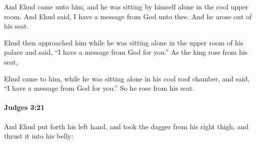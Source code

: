 			\begin{versebox}
					\item[BHS] 
					\item[ASV] And Ehud came unto him; and he was sitting by himself alone in the cool upper room. And Ehud said, I have a message from God unto thee. And he arose out of his seat.
					\item[NIV] Ehud then approached him while he was sitting alone in the upper room of his palace and said, “I have a message from God for you.” As the king rose from his seat,
					\item[NRSV] Ehud came to him, while he was sitting alone in his cool roof chamber, and said, “I have a message from God for you.” So he rose from his seat.
			\end{versebox}

		\paragraph{Judges 3:21} %
			\label{JUDGES-3-21}

			And Ehud put forth his left hand, and took the dagger from his right thigh, and thrust it into his belly:

